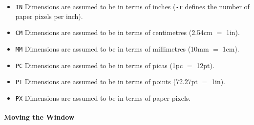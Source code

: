 \begin{itemize}
\item{\tt IN}
Dimensions are assumed to be in terms of inches
({\tt -r} defines the number of paper pixels per inch).

\item{\tt CM}
Dimensions are assumed to be in terms of centimetres
(2.54cm $=$ 1in).

\item{\tt MM}
Dimensions are assumed to be in terms of millimetres
(10mm $=$ 1cm).

\item{\tt PC}
Dimensions are assumed to be in terms of picas
(1pc $=$ 12pt).

\item{\tt PT}
Dimensions are assumed to be in terms of points
(72.27pt $=$ 1in).

\item{\tt PX}
Dimensions are assumed to be in terms of paper pixels.
\end{itemize}

\paragraph{Moving the Window}


